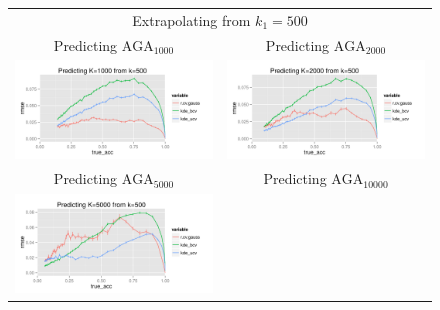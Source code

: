 \documentclass[twoside,11pt]{article}
\newenvironment{myfont}{\fontfamily{phv}\selectfont}{\par}
\begin{document}
\begin{figure}
\centering
\begin{tabular}{cc}
\multicolumn{2}{c}{\begin{myfont}Extrapolating from $k_1 = 500$\end{myfont}}\\
\begin{myfont}Predicting $\text{AGA}_{1000}$\end{myfont} &
\begin{myfont}Predicting $\text{AGA}_{2000}$\end{myfont}\\
\includegraphics[scale = 0.55, clip = true, trim = 0 0 0 0in]{sim_large7_K1_k0_5.png} &
\includegraphics[scale = 0.55, clip = true, trim = 0 0 0 0in]{sim_large7_K2_k0_5.png}\\
\begin{myfont}Predicting $\text{AGA}_{5000}$\end{myfont} &
\begin{myfont}Predicting $\text{AGA}_{10000}$\end{myfont}\\
\includegraphics[scale = 0.55, clip = true, trim = 0 0 0 0in]{sim_large7_K5_k0_5.png} &

\end{tabular}
\end{figure}
\end{document}
